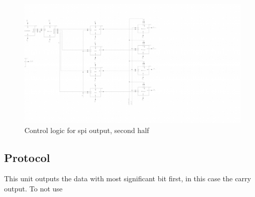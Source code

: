 \begin{figure}[H]
\centering
\captionsetup{justification=centering}
\includegraphics[scale=0.2]{../figures/spi_out2.png}
\caption{Control logic for spi output, second half}
\label{spi_out2}
\end{figure}

\subsection{Protocol}
This unit outputs the data with most significant bit first, in this case the carry output. To not use 
